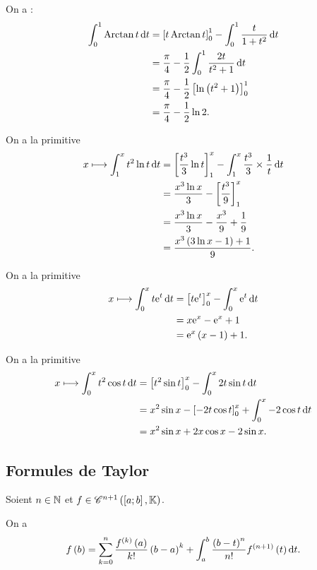\begin{corr}[2]
On a : \[\begin{aligned}
\int_0^1\Arctan t\odif{t}&=\croch{t\Arctan t}_0^1-\int_0^1\dfrac{t}{1+t^2}\odif{t} \\
&=\dfrac{\pi}{4}-\dfrac{1}{2}\int_0^1\dfrac{2t}{t^2+1}\odif{t} \\
&=\dfrac{\pi}{4}-\dfrac{1}{2}\croch{\ln\paren{t^2+1}}_0^1 \\
&=\dfrac{\pi}{4}-\dfrac{1}{2}\ln2.
\end{aligned}\]
\end{corr}

\begin{corr}[3]
On a la primitive \[\begin{aligned}
x\mapsto\int_1^xt^2\ln t\odif{t}&=\croch{\dfrac{t^3}{3}\ln t}_1^x-\int_1^x\dfrac{t^3}{3}\times\dfrac{1}{t}\odif{t} \\
&=\dfrac{x^3\ln x}{3}-\croch{\dfrac{t^3}{9}}_1^x \\
&=\dfrac{x^3\ln x}{3}-\dfrac{x^3}{9}+\dfrac{1}{9} \\
&=\dfrac{x^3\paren{3\ln x-1}+1}{9}.
\end{aligned}\]
\end{corr}

\begin{corr}[4]
On a la primitive \[\begin{aligned}
x\mapsto\int_0^xt\e{t}\odif{t}&=\croch{t\e{t}}_0^x-\int_0^x\e{t}\odif{t} \\
&=x\e{x}-\e{x}+1 \\
&=\e{x}\paren{x-1}+1.
\end{aligned}\]
\end{corr}

\begin{corr}[5]
On a la primitive \[\begin{aligned}
x\mapsto\int_0^xt^2\cos t\odif{t}&=\croch{t^2\sin t}_0^x-\int_0^x2t\sin t\odif{t} \\
&=x^2\sin x-\croch{-2t\cos t}_0^x+\int_0^x-2\cos t\odif{t} \\
&=x^2\sin x+2x\cos x-2\sin x.
\end{aligned}\]
\end{corr}

\subsection{Formules de Taylor}

\begin{theo}
Soient \(n\in\mathbb{N}\) et \(f\in\mathscr{C}^{n+1}\left(\left[a;b\right],\mathbb{K}\right)\).

On a \[f\paren{b}=\sum_{k=0}^n\dfrac{f\deriv{k}\paren{a}}{k!}\paren{b-a}^k+\int_a^b\dfrac{\paren{b-t}^n}{n!}f\deriv{n+1}\paren{t}\odif{t}.\]
\end{theo}

